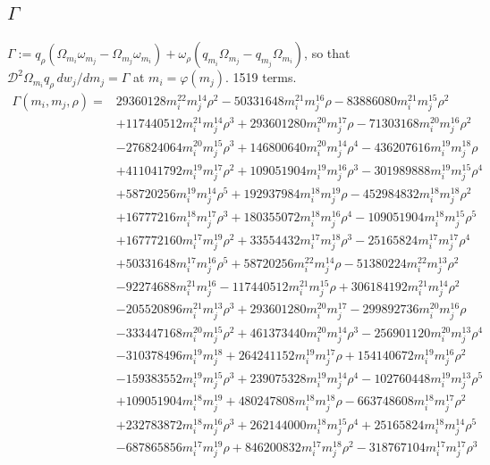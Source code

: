 \subsection*{$\Gamma$}
$\Gamma:=q_\rho(\Omega_{m_i}\omega_{m_j}-\Omega_{m_j}\omega_{m_i})+\omega_\rho(q_{m_i}\Omega_{m_j}-q_{m_j}\Omega_{m_i})$, so that $\mathcal D^2\Omega_{m_i}q_\rho\,dw_j/dm_j=\Gamma$ at $m_i=\varphi(m_j)$. 1519 terms.
{\small
\begin{align*}
\Gamma(m_i,m_j,\rho)={}&29360128m_i^{22}m_j^{14}\rho^{2}-50331648m_i^{21}m_j^{16}\rho-83886080m_i^{21}m_j^{15}\rho^{2}\\
&+117440512m_i^{21}m_j^{14}\rho^{3}+293601280m_i^{20}m_j^{17}\rho-71303168m_i^{20}m_j^{16}\rho^{2}\\
&-276824064m_i^{20}m_j^{15}\rho^{3}+146800640m_i^{20}m_j^{14}\rho^{4}-436207616m_i^{19}m_j^{18}\rho\\
&+411041792m_i^{19}m_j^{17}\rho^{2}+109051904m_i^{19}m_j^{16}\rho^{3}-301989888m_i^{19}m_j^{15}\rho^{4}\\
&+58720256m_i^{19}m_j^{14}\rho^{5}+192937984m_i^{18}m_j^{19}\rho-452984832m_i^{18}m_j^{18}\rho^{2}\\
&+16777216m_i^{18}m_j^{17}\rho^{3}+180355072m_i^{18}m_j^{16}\rho^{4}-109051904m_i^{18}m_j^{15}\rho^{5}\\
&+167772160m_i^{17}m_j^{19}\rho^{2}+33554432m_i^{17}m_j^{18}\rho^{3}-25165824m_i^{17}m_j^{17}\rho^{4}\\
&+50331648m_i^{17}m_j^{16}\rho^{5}+58720256m_i^{22}m_j^{14}\rho-51380224m_i^{22}m_j^{13}\rho^{2}\\
&-92274688m_i^{21}m_j^{16}-117440512m_i^{21}m_j^{15}\rho+306184192m_i^{21}m_j^{14}\rho^{2}\\
&-205520896m_i^{21}m_j^{13}\rho^{3}+293601280m_i^{20}m_j^{17}-299892736m_i^{20}m_j^{16}\rho\\
&-333447168m_i^{20}m_j^{15}\rho^{2}+461373440m_i^{20}m_j^{14}\rho^{3}-256901120m_i^{20}m_j^{13}\rho^{4}\\
&-310378496m_i^{19}m_j^{18}+264241152m_i^{19}m_j^{17}\rho+154140672m_i^{19}m_j^{16}\rho^{2}\\
&-159383552m_i^{19}m_j^{15}\rho^{3}+239075328m_i^{19}m_j^{14}\rho^{4}-102760448m_i^{19}m_j^{13}\rho^{5}\\
&+109051904m_i^{18}m_j^{19}+480247808m_i^{18}m_j^{18}\rho-663748608m_i^{18}m_j^{17}\rho^{2}\\
&+232783872m_i^{18}m_j^{16}\rho^{3}+262144000m_i^{18}m_j^{15}\rho^{4}+25165824m_i^{18}m_j^{14}\rho^{5}\\
&-687865856m_i^{17}m_j^{19}\rho+846200832m_i^{17}m_j^{18}\rho^{2}-318767104m_i^{17}m_j^{17}\rho^{3}\\

\end{align*}}
